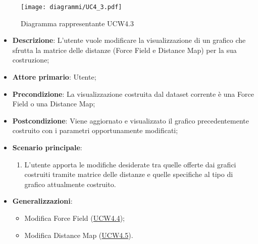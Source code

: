 \begin{figure}[h]
    \centering
    \texttt{[image: diagrammi/UC4\_3.pdf]}
    \caption{Diagramma rappresentante UCW4.3}
    \label{fig:UCW4.3}
\end{figure}

\begin{itemize}
    \item \textbf{Descrizione}: L’utente vuole modificare la visualizzazione di un grafico che sfrutta la matrice delle 
    distanze (Force Field e Distance Map) per la sua costruzione;
    \item \textbf{Attore primario}: Utente;
    \item \textbf{Precondizione}: La visualizzazione costruita dal dataset corrente è una Force Field o una Distance Map;
    \item \textbf{Postcondizione}: Viene aggiornato e visualizzato il grafico precedentemente costruito con i parametri opportunamente modificati;
    \item \textbf{Scenario principale}:
    \begin{enumerate}
        \item L’utente apporta le modifiche desiderate tra quelle offerte dai grafici costruiti tramite matrice delle 
        distanze e quelle specifiche al tipo di grafico attualmente costruito.
    \end{enumerate}
    \item \textbf{Generalizzazioni}:
    \begin{itemize}
        \item Modifica Force Field (\hyperref[ssub:ucw4.4]{UCW4.4});
        \item Modifica Distance Map (\hyperref[ssub:ucw4.5]{UCW4.5}).
    \end{itemize}
\end{itemize}

